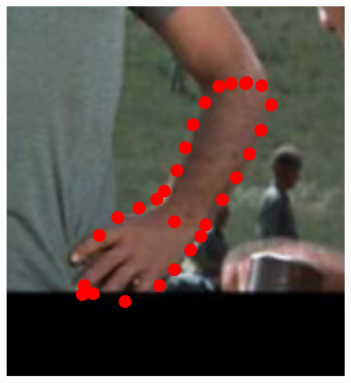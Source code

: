 \begin{figure}[!t]
    \hfill
    \includegraphics[height=\ofh]{resources/Annotation_Correction/Fittings/6.eps}
    \hfill

\end{figure}
